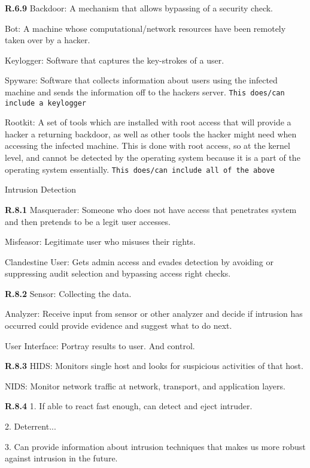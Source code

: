 \documentclass{report}
\begin{document}
{\bf R.6.9} 
Backdoor: A mechanism that allows bypassing of a security check.

Bot: A machine whose computational/network resources have been remotely taken
over by a hacker.

Keylogger: Software that captures the key-strokes of a user. 

Spyware: Software that collects information about users using the infected
machine and sends the information off to the hackers server. \texttt{This
does/can include a keylogger}

Rootkit: A set of tools which are installed with root access that will provide a
hacker a returning backdoor, as well as other tools the hacker might need when
accessing the infected machine. This is done with root access, so at the kernel
level, and cannot be detected by the operating system because it is a part of
the operating system essentially. \texttt{This does/can include all of the above}



\large{Intrusion Detection}

{\bf R.8.1}
Masquerader: Someone who does not have access that penetrates system and then
pretends to be a legit user accesses.

Misfeasor: Legitimate user who misuses their rights.

Clandestine User: Gets admin access and evades detection by avoiding or
suppressing audit selection and bypassing access right checks.


{\bf R.8.2}
Sensor: Collecting the data.

Analyzer: Receive input from sensor or other analyzer and decide if intrusion
has occurred could provide evidence and suggest what to do next.

User Interface: Portray results to user. And control.

{\bf R.8.3}
HIDS: Monitors single host and looks for suspicious activities of that host.

NIDS: Monitor network traffic at network, transport, and application layers.

{\bf R.8.4}
1. If able to react fast enough, can detect and eject intruder.

2. Deterrent...

3. Can provide information about intrusion techniques that makes us more robust
against intrusion in the future.

\end{document}
